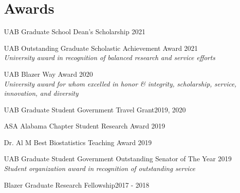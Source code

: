 \section{Awards} 
\begin{lonelist}
\item UAB Graduate School Dean's Scholarship \hfill 2021
\item UAB Outstanding Graduate Scholastic Achievement Award \hfill 2021\\
\textit{University award in recognition of balanced research and service efforts}
\item UAB Blazer Way Award \hfill 2020\\
\textit{University award for whom excelled in honor \& integrity, scholarship, service, innovation, and diversity}
\item UAB Graduate Student Government Travel Grant\hfill 2019, 2020
\item ASA Alabama Chapter Student Research Award \hfill 2019
\item Dr. Al M Best Biostatistics Teaching Award \hfill 2019
\item UAB Graduate Student Government Outstanding Senator of The Year \hfill 2019\\
\textit{Student organization award in recognition of outstanding service}
\item Blazer Graduate Research Fellowship\hfill 2017 - 2018
\end{lonelist}
